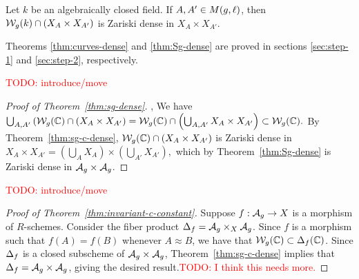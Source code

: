 \documentclass{amsart}
\begin{document}
\begin{theorem}\label{thm:Sg-dense}
  Let $k$ be an algebraically closed field. If $A,A' \in M(g,\ell)$, then $\mathcal{W}_g(k) \cap (X_A \times X_{A'})$ is Zariski dense in $X_A \times X_{A'}$.
\end{theorem}

Theorems \ref{thm:curves-dense} and \ref{thm:Sg-dense} are proved in sections \ref{sec:step-1} and \ref{sec:step-2}, respectively.

\textcolor{red}{TODO: introduce/move}

\begin{proof}[Proof of Theorem~\ref{thm:sg-dense}], 
We have 
$\bigcup_{A,A'} \left(\mathcal{W}_g(\mathbb{C}) \cap (X_A \times X_{A'}\right) =  \mathcal{W}_g(\mathbb{C}) \cap \left(\bigcup_{A,A'} X_A \times X_{A'}\right)
   \subset \mathcal{W}_g(\mathbb{C}).$
By Theorem~\ref{thm:sg-c-dense},
$\mathcal{W}_g(\mathbb{C}) \cap (X_A \times X_{A'})$ is Zariski dense in $X_A \times X_{A'} =
    \left(\bigcup_{A} X_A\right) \times \left(\bigcup_{A'} X_{A'}\right),$ which by Theorem~\ref{thm:Sg-dense} is Zariski dense in $\mathcal{A}_g \times \mathcal{A}_g$.
\end{proof}

\textcolor{red}{TODO: introduce/move}

\begin{proof}[Proof of Theorem~\ref{thm:invariant-c-constant}]
  Suppose $f: \mathcal{A}_g \to X$ is a morphism of $R$-schemes. Consider the fiber product $\Delta_f = \mathcal{A}_g \times_X \mathcal{A}_g$. 
Since $f$ is a morphism such that $f(A) = f(B)$ whenever $A \approx B$, we have that $\mathcal{W}_g(\mathbb{C}) \subset \Delta_f(\mathbb{C})$.
   Since $\Delta_f$ is a closed subscheme of $\mathcal{A}_g \times \mathcal{A}_g$, Theorem~\ref{thm:sg-c-dense} implies that $\Delta_f = \mathcal{A}_g \times \mathcal{A}_g$, giving the desired result.\textcolor{red}{TODO: I think this needs more.}
\end{proof}
\end{document}
